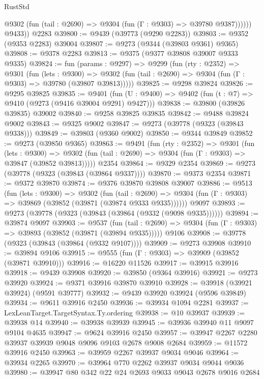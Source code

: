 \begin{lexlean}{RustStd}
\begin{coremodule}
              @9302 (fun (tail : @2690) => @9304 (fun (Γ : @9303) => @39780 @9387))))))
        @9433))
    @2283
@39800 := @9439 (@39773 (@9290 @2283))
@39803 := @9352 (@9353 @2283) @39004
@39807 := @9273 (@9344 (@39803 @9361) @9365)
@39808 := @9378 @2283
@39813 := @9375 (@9377 @39808 @39007 @9333 @9335)
@39824 := fun (params : @9297) =>
  @9299
    (fun (rty : @2352) =>
    @9301
      (fun (lets : @9300) =>
      @9302 (fun (tail : @2690) => @9304 (fun (Γ : @9303) => @39780 (@39807 @39813)))))
@39825 := @9298 @39824
@39826 := @9295 @39825
@39835 := @9401
    (fun (U : @9400) => @9402 (fun (t : @7) => @9410 (@9273 (@9416 @39004 @9291) @9427)))
@39838 := @39800 (@39826 @39835) @39002
@39840 := @9258 @39825 @39835
@39842 := @9488 @39824 @9002
@39843 := @9325 @9002
@39847 := @9273 (@39778 (@9323 (@39843 @9338)))
@39849 := @39803 (@9360 @9002)
@39850 := @9344 @39849
@39852 := @9273 (@39850 @9365)
@39863 := @9491
    (fun (rty : @2352) =>
    @9301
      (fun (lets : @9300) =>
      @9302 (fun (tail : @2690) => @9304 (fun (Γ : @9303) => @39847 (@39852 @39813)))))
    @2354
@39864 := @9329 @2354
@39869 := @9273 (@39778 (@9323 (@39843 (@39864 @9337))))
@39870 := @9373 @2354
@39871 := @9372 @39870
@39874 := @9376 @39870 @39808 @39007
@39886 := @9513
    (fun (lets : @9300) =>
    @9302
      (fun (tail : @2690) =>
      @9304 (fun (Γ : @9303) => @39869 (@39852 (@39871 (@39874 @9333 @9335))))))
    @9097
@39893 := @9273 (@39778 (@9323 (@39843 (@39864 (@9332 (@9098 @9335))))))
@39894 := @39874 @9097
@39903 := @9537
    (fun (tail : @2690) => @9304 (fun (Γ : @9303) => @39893 (@39852 (@39871 (@39894 @9335)))))
    @9106
@39908 := @39778 (@9323 (@39843 (@39864 (@9332 @9107))))
@39909 := @9273 @39908
@39910 := @39894 @9106
@39915 := @9555 (fun (Γ : @9303) => @39909 (@39852 (@39871 @39910)))
@39916 := @16220 @11526
@39917 := @39915 @39916
@39918 := @9439 @39908
@39920 := @39850 (@9364 @39916)
@39921 := @9273 @39920
@39924 := @9371 @39916 @39870 @39910
@39928 := @39918 (@39921 @39924) (@9591 @39777)
@39932 := @9439 @39920 @39924 (@9596 @39849)
@39934 := @9611 @39916 @2450
@39936 := @39934 @1094 @2281
@39937 := LexLeanTarget.TargetSyntax.Ty.ordering
@39938 := @10 @39937
@39939 := @39938 @14
@39940 := @39938 @39939
@39945 := @39936 @39940 @11 @9097 @9104 @4635
@39947 := @9624 @39916 @2450
@39957 := @39947 @2267 @2280 @39937 @39939 @9048 @9096 @9103 @2678 @9008 @2684
@39959 := @11572 @39916 @2450
@39963 := @39959 @2267 @39937 @9034 @9046
@39964 := @39934 @2265
@39970 := @39964 @770 @2262 @39937 @9034 @9044 @9036
@39980 := @39947 @80 @342 @22 @24 @2693 @9033 @9043 @2678 @9016 @2684

\end{coremodule}
\end{lexlean}
